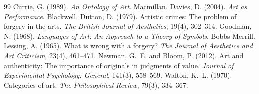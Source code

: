 \documentclass{situationist-preprint}
\begin{document}
\begin{thebibliography}{99}\small
{} Currie, G. (1989). \emph{An Ontology of Art}. Macmillan.
 Davies, D. (2004). \emph{Art as Performance}. Blackwell.
 Dutton, D. (1979). Artistic crimes: The problem of forgery in the arts. \emph{The British Journal of Aesthetics}, 19(4), 302--314.
 Goodman, N. (1968). \emph{Languages of Art: An Approach to a Theory of Symbols}. Bobbs-Merrill.
 Lessing, A. (1965). What is wrong with a forgery? \emph{The Journal of Aesthetics and Art Criticism}, 23(4), 461--471.
 Newman, G.~E. and Bloom, P. (2012). Art and authenticity: The importance of originals in judgments of value. \emph{Journal of Experimental Psychology: General}, 141(3), 558--569.
 Walton, K.~L. (1970). Categories of art. \emph{The Philosophical Review}, 79(3), 334--367.
\end{thebibliography}
\end{document}
